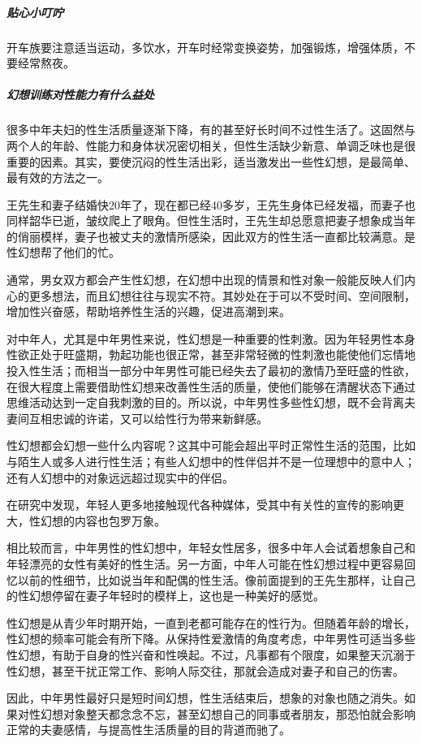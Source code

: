 \subparagraph{贴心小叮咛}

开车族要注意适当运动，多饮水，开车时经常变换姿势，加强锻炼，增强体质，不要经常熬夜。

\subparagraph{幻想训练对性能力有什么益处}

很多中年夫妇的性生活质量逐渐下降，有的甚至好长时间不过性生活了。这固然与两个人的年龄、性能力和身体状况密切相关，但性生活缺少新意、单调乏味也是很重要的因素。其实，要使沉闷的性生活出彩，适当激发出一些性幻想，是最简单、最有效的方法之一。

王先生和妻子结婚快20年了，现在都已经40多岁，王先生身体已经发福，而妻子也同样韶华已逝，皱纹爬上了眼角。但性生活时，王先生却总愿意把妻子想象成当年的俏丽模样，妻子也被丈夫的激情所感染，因此双方的性生活一直都比较满意。是性幻想帮了他们的忙。

通常，男女双方都会产生性幻想，在幻想中出现的情景和性对象一般能反映人们内心的更多想法，而且幻想往往与现实不符。其妙处在于可以不受时间、空间限制，增加性兴奋感，帮助培养性生活的兴趣，促进高潮到来。

对中年人，尤其是中年男性来说，性幻想是一种重要的性刺激。因为年轻男性本身性欲正处于旺盛期，勃起功能也很正常，甚至非常轻微的性刺激也能使他们忘情地投入性生活；而相当一部分中年男性可能已经失去了最初的激情乃至旺盛的性欲，在很大程度上需要借助性幻想来改善性生活的质量，使他们能够在清醒状态下通过思维活动达到一定自我刺激的目的。所以说，中年男性多些性幻想，既不会背离夫妻间互相忠诚的许诺，又可以给性行为带来新鲜感。

性幻想都会幻想一些什么内容呢？这其中可能会超出平时正常性生活的范围，比如与陌生人或多人进行性生活；有些人幻想中的性伴侣并不是一位理想中的意中人；还有人幻想中的对象远远超过现实中的伴侣。

在研究中发现，年轻人更多地接触现代各种媒体，受其中有关性的宣传的影响更大，性幻想的内容也包罗万象。

相比较而言，中年男性的性幻想中，年轻女性居多，很多中年人会试着想象自己和年轻漂亮的女性有美好的性生活。另一方面，中年人可能在性幻想过程中更容易回忆以前的性细节，比如说当年和配偶的性生活。像前面提到的王先生那样，让自己的性幻想停留在妻子年轻时的模样上，这也是一种美好的感觉。

性幻想是从青少年时期开始，一直到老都可能存在的性行为。但随着年龄的增长，性幻想的频率可能会有所下降。从保持性爱激情的角度考虑，中年男性可适当多些性幻想，有助于自身的性兴奋和性唤起。不过，凡事都有个限度，如果整天沉溺于性幻想，甚至干扰正常工作、影响人际交往，那就会造成对妻子和自己的伤害。

因此，中年男性最好只是短时间幻想，性生活结束后，想象的对象也随之消失。如果对性幻想对象整天都念念不忘，甚至幻想自己的同事或者朋友，那恐怕就会影响正常的夫妻感情，与提高性生活质量的目的背道而驰了。

